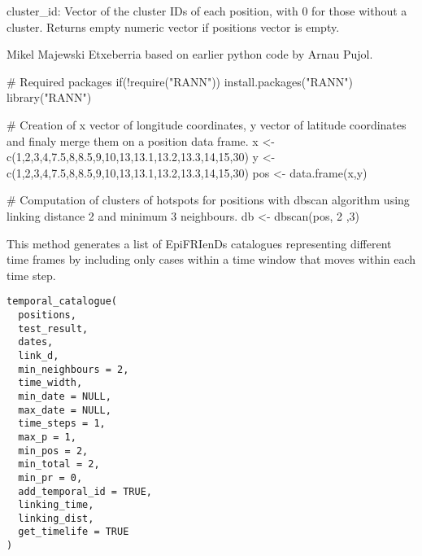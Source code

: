 \documentclass[a4paper]{book}
\begin{document}
%
\begin{Value}
cluster\_id: Vector of the cluster IDs of each position, with 0 for those without a cluster. Returns empty numeric vector if positions vector is empty.
\end{Value}
%
\begin{Author}\relax
Mikel Majewski Etxeberria based on earlier python code by Arnau Pujol.
\end{Author}
%
\begin{Examples}
\begin{ExampleCode}
# Required packages
if(!require("RANN")) install.packages("RANN")
library("RANN")

# Creation of x vector of longitude coordinates, y vector of latitude coordinates and finaly merge them on a position data frame.
x <- c(1,2,3,4,7.5,8,8.5,9,10,13,13.1,13.2,13.3,14,15,30)
y <- c(1,2,3,4,7.5,8,8.5,9,10,13,13.1,13.2,13.3,14,15,30)
pos <- data.frame(x,y)

# Computation of clusters of hotspots for positions with dbscan algorithm using linking distance 2 and minimum 3 neighbours.
db <- dbscan(pos, 2 ,3)
\end{ExampleCode}
\end{Examples}
%
\begin{Description}\relax
This method generates a list of EpiFRIenDs catalogues representing different time frames by including only cases within a time window that moves within each time step.
\end{Description}
%
\begin{Usage}
\begin{verbatim}
temporal_catalogue(
  positions,
  test_result,
  dates,
  link_d,
  min_neighbours = 2,
  time_width,
  min_date = NULL,
  max_date = NULL,
  time_steps = 1,
  max_p = 1,
  min_pos = 2,
  min_total = 2,
  min_pr = 0,
  add_temporal_id = TRUE,
  linking_time,
  linking_dist,
  get_timelife = TRUE
)
\end{verbatim}
\end{Usage}
%
\end{document}
